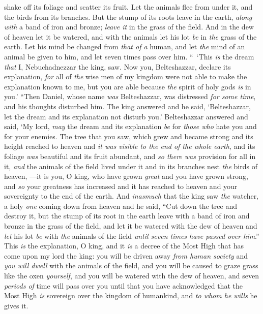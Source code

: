 \begin{biblechapter}
shake off its foliage and scatter its fruit. 
Let the animals flee from under it, 
and the birds from its branches.
\verse But the stump of its roots 
leave in the earth, 
\textit{along with} a band of iron and bronze; 
\textit{leave it} in the grass of the field. 
And in the dew of heaven 
let it be watered, 
and with the animals 
let his lot \textit{be} in \textit{the} grass of the earth.
\verse Let his mind be changed from \textit{that of a} human, 
and let \textit{the} mind of an animal be given to him, 
and let seven times pass over him.
\verse “ ‘This \textit{is} the dream \textit{that} I, Nebuchadnezzar the king, saw. Now you, Belteshazzar, declare its explanation, \textit{for} all of \textit{the} wise men of my kingdom were not able to make the explanation known to me, but you are able because \textit{the} spirit of holy gods \textit{is} in you.’
 “Then Daniel, whose name \textit{was} Belteshazzar, was distressed \textit{for some time}, and his thoughts disturbed him. The king answered and he said, ‘Belteshazzar, let the dream and its explanation not disturb you.’ Belteshazzar answered and said, ‘My lord, \textit{may} the dream and its explanation \textit{be} for \textit{those who} hate you and for your enemies.
\verse The tree that you saw, which grew and became strong and its height reached to heaven and \textit{it was visible to the end of the whole earth},
\verse and its foliage \textit{was} beautiful and its fruit abundant, and \textit{so there was} provision for all in it, \textit{and} the animals of the field lived under it and in its branches nest \textit{the} birds of heaven,
\verse —it is you, O king, who have grown \textit{great} and you have grown strong, and \textit{so} your greatness has increased and it has reached to heaven and your sovereignty to the end of the earth.
\verse And \textit{inasmuch} that the king saw \textit{the} watcher, a holy \textit{one} coming down from heaven and he said, “Cut down the tree and destroy it, but the stump of its root in the earth leave with a band of iron and bronze in the grass of the field, and let it be watered with the dew of heaven and \textit{let} his lot \textit{be} with \textit{the} animals of the field \textit{until seven times have passed over him}.”
\verse This \textit{is} the explanation, O king, and it \textit{is} a decree of the Most High that has come upon my lord the king:
\verse you will be driven away \textit{from human society} and \textit{you will dwell} with the animals of the field, and you will be caused to graze grass like the oxen \textit{yourself}, and you will be watered with the dew of heaven, and seven \textit{periods of} time will pass over you until that you have acknowledged that the Most High \textit{is} sovereign over the kingdom of humankind, and \textit{to whom he wills} he gives it.

\end{biblechapter}
